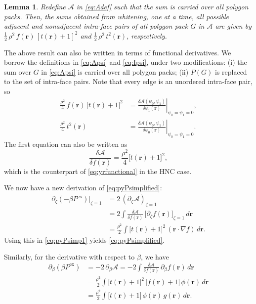 \documentclass[preprint]{revtex4-1}
\newtheorem{lemm}[thrm]{Lemma}
\newcommand{\vct}[1]{\mathbf{#1}}
\providecommand{\vr}{} %
\renewcommand{\vr}{\vct{r}}
\newcommand{\supex}[1]{ { { #1 }^{ \mathrm{ex} } } }
\newcommand{\Pex}{\supex{P}}
\newcommand{\A}{\mathcal{A}}
\begin{document}
\begin{lemm}
Redefine $\A$ in \eqref{eq:Adef}
such that the sum is carried over all polygon packs.
Then, the sums obtained from whitening,
one at a time,
all possible
adjacent and nonadjacent intra-face pairs
of all polygon pack $G$ in $\A$
are given by
$\frac{1}{2} \, \rho^2 \, f(\vr) \, [t(\vr) + 1]^2$
and
$\frac{1}{2} \, \rho^2 \, t^2(\vr)$,
respectively.
\label{thm:whitenApy}
\end{lemm}


The above result can also be written
in terms of functional derivatives.
%
We borrow the definitions in
\eqref{eq:Apsi} and \eqref{eq:Ipsi},
under two modifications:
(i) the sum over $G$ in \eqref{eq:Apsi}
is carried over all polygon packs;
(ii) $P(G)$ is replaced to the set of intra-face pairs.
%
Note that every edge is an unordered intra-face pair, so
%
\begin{align*}
\frac{\rho^2}{4} \, f(\vr) \, \bigl[ t(\vr) + 1 \bigr]^2
&=
\left.
\frac{ \delta \A(\psi_0, \psi_1) } { \delta \psi_1(\vr) }
\right|_{\psi_0 = \psi_1 = 0},
\\
\frac{\rho^2}{4} \, t^2(\vr)
&=
\left.
\frac{ \delta \A(\psi_0, \psi_1) } { \delta \psi_0(\vr) }
\right|_{\psi_0 = \psi_1 = 0}.
\end{align*}
%
The first equation can also be written as
\begin{equation}
  \frac{ \delta \A } { \delta f(\vr)}
=
  \frac{ \rho^2 } {4}
  \bigl[ t(\vr) + 1 \bigr]^2,
  \label{eq:yrfunctionalhnc}
\end{equation}
%
which is the counterpart of \eqref{eq:yrfunctional}
in the HNC case.


We now have a new derivation of \eqref{eq:pyPsimplified}:
%
\begin{align*}
  \partial_\zeta (-\beta \Pex) \big|_{\zeta = 1}
&=
  2 \, (\partial_\zeta \A)_{\zeta = 1}
\\
&=
  2 \int \frac{ \delta \A } { \delta f(\vr) } \,
  \big[ \partial_\zeta f(\vr) \big]_{\zeta = 1} \, d\vr
\\
&=
  \frac{\rho^2}{2}
  \int \bigl[ t(\vr) + 1 \bigr]^2 \,
  (\vr \cdot \nabla f) \, d\vr.
\end{align*}
%
Using this in \eqref{eq:pyPsimp1} yields \eqref{eq:pyPsimplified}.

Similarly,
for the derivative with respect to $\beta$, we have
\begin{align*}
  \partial_\beta (\beta \Pex)
&=
  -2 \, \partial_\beta \A
=
  -2 \int \frac{ \delta \A } { \delta f(\vr) } \,
  \partial_\beta f(\vr) \, d\vr
\\
&=
  \frac{\rho^2}{2}
  \int \bigl[ t(\vr) + 1 \bigr]^2 \,
  \big[ f(\vr) + 1 \bigr] \,
  \phi(\vr) \, d\vr
\\
&=
  \frac{\rho^2}{2}
  \int
  \bigl[ t(\vr) + 1 \bigr] \,
  \phi(\vr) \,
  g(\vr) \,
  d\vr.
\end{align*}
%
\end{document}
